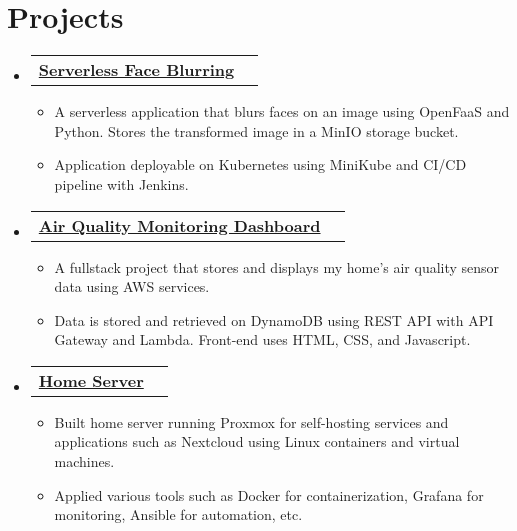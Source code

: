 \documentclass[letterpaper,12pt]{article}
\makeatletter
\newcommand{\resumeItem}[1]{
  \item\small{
    {#1 \vspace{-2pt}}
  }
}
\newcommand{\resumeProjectHeading}[2]{
    \item
    \begin{tabular*}{0.97\textwidth}{l@{\extracolsep{\fill}}r}
      \small#1 & #2 \\
    \end{tabular*}\vspace{-7pt}
}
\newcommand{\resumeSubHeadingListStart}{\begin{itemize}[leftmargin=0.05in, label={}]}
\newcommand{\resumeSubHeadingListEnd}{\end{itemize}}
\newcommand{\resumeItemListStart}{\begin{itemize}}
\newcommand{\resumeItemListEnd}{\end{itemize}\vspace{-5pt}}
\makeatother
\begin{document}
\section{Projects}
    \resumeSubHeadingListStart
      
    \resumeProjectHeading
    {\textbf{\href{https://github.com/jamesyoung-15/serverless-face-blurring}{ {Serverless Face Blurring}}}    \emph{}}{}
    \resumeItemListStart
      \resumeItem{\normalsize{A serverless application that blurs faces on an image using OpenFaaS and Python. Stores the transformed image in a MinIO storage bucket.}} 
      \resumeItem{\normalsize{Application deployable on Kubernetes using MiniKube and CI/CD pipeline with Jenkins.}}
    \resumeItemListEnd

    \resumeProjectHeading
    {\textbf{\href{https://airqualitydashboard.jyylab.com/}{ {Air Quality Monitoring Dashboard}}}    \emph{}}{}
    \resumeItemListStart
      \resumeItem{\normalsize{A fullstack project that stores and displays my home's air quality sensor data using AWS services.}} 
      \resumeItem{\normalsize{Data is stored and retrieved on DynamoDB using REST API with API Gateway and Lambda. Front-end uses HTML, CSS, and Javascript.}}
    \resumeItemListEnd

      \resumeProjectHeading
      {\textbf{\href{https://github.com/jamesyoung-15/homeserver}{ {Home Server}}} \emph{}}{}
      \resumeItemListStart
        \resumeItem{\normalsize{Built home server running Proxmox for self-hosting services and applications such as Nextcloud using Linux containers and virtual machines.}}
        \resumeItem{\normalsize{Applied various tools such as Docker for containerization, Grafana for monitoring, Ansible for automation, etc.}}
      \resumeItemListEnd




    \resumeSubHeadingListEnd




\end{document}
